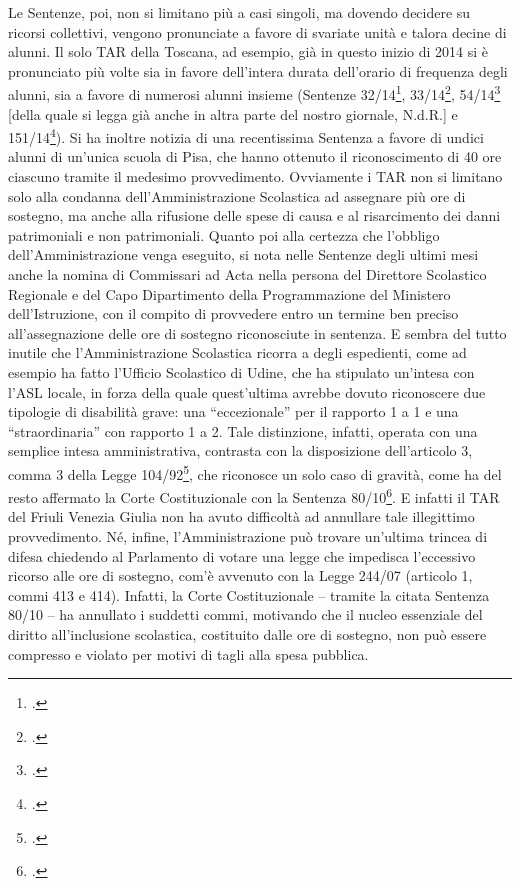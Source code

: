 Le Sentenze, poi, non si limitano più a casi singoli, ma dovendo decidere su ricorsi collettivi, vengono pronunciate a favore di svariate unità e talora decine di alunni. Il solo TAR della Toscana, ad esempio, già in questo inizio di 2014 si è pronunciato più volte sia in favore dell'intera durata dell'orario di frequenza degli alunni, sia a favore di numerosi alunni insieme (Sentenze 32/14\footcite{TARToscana2014a}, 33/14\footcite{TARToscana2014b}, 54/14\footcite{TARToscana2014c} [della quale si legga già anche in altra parte del nostro giornale\pageref{cha:lancioni240114}, N.d.R.] e 151/14\footcite{TARToscana2014d}). Si ha inoltre notizia di una recentissima Sentenza a favore di undici alunni di un'unica scuola di Pisa, che hanno ottenuto il riconoscimento di 40 ore ciascuno tramite il medesimo provvedimento.
Ovviamente i TAR non si limitano solo alla condanna dell'Amministrazione Scolastica ad assegnare più ore di sostegno, ma anche alla rifusione delle spese di causa e al risarcimento dei danni patrimoniali e non patrimoniali. Quanto poi alla certezza che l'obbligo dell'Amministrazione venga eseguito, si nota nelle Sentenze degli ultimi mesi anche la nomina di Commissari ad Acta nella persona del Direttore Scolastico Regionale e del Capo Dipartimento della Programmazione del Ministero dell'Istruzione, con il compito di provvedere entro un termine ben preciso all'assegnazione delle ore di sostegno riconosciute in sentenza.
E sembra del tutto inutile che l'Amministrazione Scolastica ricorra a degli espedienti, come ad esempio ha fatto l'Ufficio Scolastico di Udine, che ha stipulato un'intesa con l'ASL locale, in forza della quale quest'ultima avrebbe dovuto riconoscere due tipologie di disabilità grave: una “eccezionale” per il rapporto 1 a 1 e una “straordinaria” con rapporto 1 a 2. Tale distinzione, infatti, operata con una semplice intesa amministrativa, contrasta con la disposizione dell'articolo 3, comma 3 della Legge 104/92\footcite{Legge_104_92}, che riconosce un solo caso di gravità, come ha del resto affermato la Corte Costituzionale con la Sentenza 80/10\footcite{SCC_80_2010}. E infatti il TAR del Friuli Venezia Giulia non ha avuto difficoltà ad annullare tale illegittimo provvedimento.
Né, infine, l'Amministrazione può trovare un'ultima trincea di difesa chiedendo al Parlamento di votare una legge che impedisca l'eccessivo ricorso alle ore di sostegno, com'è avvenuto con la Legge 244/07 (articolo 1, commi 413 e 414). Infatti, la Corte Costituzionale – tramite la citata Sentenza 80/10 – ha annullato i suddetti commi, motivando che il nucleo essenziale del diritto all'inclusione scolastica, costituito dalle ore di sostegno, non può essere compresso e violato per motivi di tagli alla spesa pubblica.

